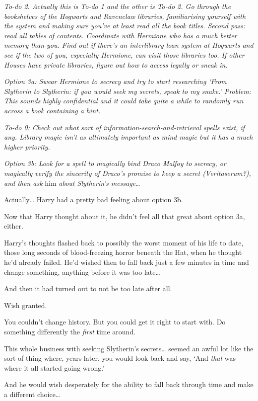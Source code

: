\emph{To-do 2. Actually this is To-do 1 and the other is To-do 2. Go
through the bookshelves of the Hogwarts and Ravenclaw libraries,
familiarising yourself with the system and making sure you've at least
read all the book titles. Second pass: read all tables of contents.
Coordinate with Hermione who has a much better memory than you. Find out
if there's an interlibrary loan system at Hogwarts and see if the two of
you, especially Hermione, can visit those libraries too. If other Houses
have private libraries, figure out how to access legally or sneak in.}

\emph{Option 3a: Swear Hermione to secrecy and try to start researching
`From Slytherin to Slytherin: if you would seek my secrets, speak to my
snake.' Problem: This sounds highly confidential and it could take quite
a while to randomly run across a book containing a hint.}

\emph{To-do 0: Check out what sort of information-search-and-retrieval
spells exist, if any. Library magic isn't as ultimately important as
mind magic but it has a much higher priority.}

\emph{Option 3b: Look for a spell to magically bind Draco Malfoy to
secrecy, or magically verify the sincerity of Draco's promise to keep a
secret (Veritaserum?), and then ask} him \emph{about Slytherin's
message\ldots{}}

Actually\ldots{} Harry had a pretty bad feeling about option 3b.

Now that Harry thought about it, he didn't feel all that great about
option 3a, either.

Harry's thoughts flashed back to possibly the worst moment of his life
to date, those long seconds of blood-freezing horror beneath the Hat,
when he thought he'd already failed. He'd wished then to fall back just
a few minutes in time and change something, anything before it was too
late\ldots{}

And then it had turned out to not be too late after all.

Wish granted.

You couldn't change history. But you could get it right to start with.
Do something differently the \emph{first} time around.

This whole business with seeking Slytherin's secrets\ldots{} seemed an
awful lot like the sort of thing where, years later, you would look back
and say, `And \emph{that} was where it all started going wrong.'

And he would wish desperately for the ability to fall back through time
and make a different choice\ldots{}

